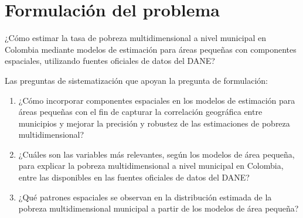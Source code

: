 
\section{Formulación del problema}
¿Cómo estimar la tasa de pobreza multidimensional a nivel municipal en Colombia mediante modelos de estimación para áreas pequeñas con componentes espaciales, utilizando fuentes oficiales de datos del DANE?

Las preguntas de sistematización que apoyan la pregunta de formulación:

\begin{enumerate}
    \item ¿Cómo incorporar componentes espaciales en los modelos de estimación para áreas pequeñas con el fin de capturar la correlación geográfica entre municipios y mejorar la precisión y robustez de las estimaciones de pobreza multidimensional?

    \item ¿Cuáles son las variables más relevantes, según los modelos de área pequeña, para explicar la pobreza multidimensional a nivel municipal en Colombia, entre las disponibles en las fuentes oficiales de datos del DANE?

    \item ¿Qué patrones espaciales se observan en la distribución estimada de la pobreza multidimensional municipal a partir de los modelos de área pequeña?
\end{enumerate}
